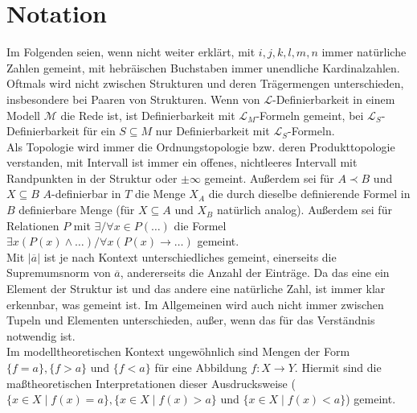 \documentclass[a4paper, 11pt]{report}
\newcommand{\fM}{\mathcal{M}}
\newcommand{\lingua}{\mathcal{L}}
\newcommand{\abs}[1]{{\left| #1 \right|}}
\theoremstyle{definition}
\begin{document}
	\tableofcontents
	\newpage
	
	\section*{Notation}
	Im Folgenden seien, wenn nicht weiter erklärt, mit $i,j,k,l,m,n$ immer natürliche Zahlen gemeint, mit hebräischen Buchstaben immer unendliche Kardinalzahlen.\\
	Oftmals wird nicht zwischen Strukturen und deren Trägermengen unterschieden, insbesondere bei Paaren von Strukturen. Wenn von $\lingua$-Definierbarkeit in einem Modell $\fM$ die Rede ist, ist Definierbarkeit mit $\lingua_M$-Formeln gemeint, bei $\lingua_S$-Definierbarkeit für ein $S\subseteq M$ nur Definierbarkeit mit $\lingua_S$-Formeln.\\
	Als Topologie wird immer die Ordnungstopologie bzw. deren Produkttopologie verstanden, mit \glqq{}Intervall\grqq{} ist immer ein offenes, nichtleeres Intervall mit Randpunkten in der Struktur oder $\pm\infty$ gemeint. Außerdem sei für $A\prec B$ und $X\subseteq B$ $A$-definierbar in $T$ die Menge $X_A$ die durch dieselbe definierende Formel in $B$ definierbare Menge (für $X\subseteq A$ und $X_B$ natürlich analog). Außerdem sei für Relationen $P$ mit \glqq{}$\exists/\forall x\in P(\dots)$\grqq{} die Formel \glqq{}$\exists x(P(x)\land\dots)/\forall x(P(x)\rightarrow\dots)$\grqq{} gemeint.\\
	Mit $\abs{\overline{a}}$ ist je nach Kontext unterschiedliches gemeint, einerseits die Supremumsnorm von $\overline{a}$, andererseits die Anzahl der Einträge. Da das eine ein Element der Struktur ist und das andere eine natürliche Zahl, ist immer klar erkennbar, was gemeint ist. Im Allgemeinen wird auch nicht immer zwischen Tupeln und Elementen unterschieden, außer, wenn das für das Verständnis notwendig ist.\\
	Im modelltheoretischen Kontext ungewöhnlich sind Mengen der Form $\{f=a\},\{f>a\}$ und $\{f<a\}$ für eine Abbildung $f:X\rightarrow Y$. Hiermit sind die maßtheoretischen Interpretationen dieser Ausdrucksweise ($\{x\in X\mid f(x)=a\},\{x\in X\mid f(x)>a\}$ und $\{x\in X\mid f(x)<a\}$) gemeint.
	
	
    
    \newpage
    \appendix
    
    
    \newpage
    {}
    
    
\end{document}
